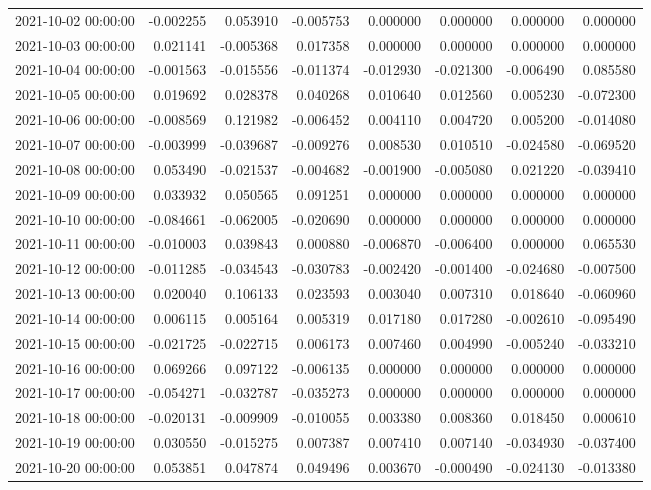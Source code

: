 \begin{tabular}{lrrrrrrr}
2021-10-02 00:00:00 & -0.002255 & 0.053910 & -0.005753 & 0.000000 & 0.000000 & 0.000000 & 0.000000 \\
2021-10-03 00:00:00 & 0.021141 & -0.005368 & 0.017358 & 0.000000 & 0.000000 & 0.000000 & 0.000000 \\
2021-10-04 00:00:00 & -0.001563 & -0.015556 & -0.011374 & -0.012930 & -0.021300 & -0.006490 & 0.085580 \\
2021-10-05 00:00:00 & 0.019692 & 0.028378 & 0.040268 & 0.010640 & 0.012560 & 0.005230 & -0.072300 \\
2021-10-06 00:00:00 & -0.008569 & 0.121982 & -0.006452 & 0.004110 & 0.004720 & 0.005200 & -0.014080 \\
2021-10-07 00:00:00 & -0.003999 & -0.039687 & -0.009276 & 0.008530 & 0.010510 & -0.024580 & -0.069520 \\
2021-10-08 00:00:00 & 0.053490 & -0.021537 & -0.004682 & -0.001900 & -0.005080 & 0.021220 & -0.039410 \\
2021-10-09 00:00:00 & 0.033932 & 0.050565 & 0.091251 & 0.000000 & 0.000000 & 0.000000 & 0.000000 \\
2021-10-10 00:00:00 & -0.084661 & -0.062005 & -0.020690 & 0.000000 & 0.000000 & 0.000000 & 0.000000 \\
2021-10-11 00:00:00 & -0.010003 & 0.039843 & 0.000880 & -0.006870 & -0.006400 & 0.000000 & 0.065530 \\
2021-10-12 00:00:00 & -0.011285 & -0.034543 & -0.030783 & -0.002420 & -0.001400 & -0.024680 & -0.007500 \\
2021-10-13 00:00:00 & 0.020040 & 0.106133 & 0.023593 & 0.003040 & 0.007310 & 0.018640 & -0.060960 \\
2021-10-14 00:00:00 & 0.006115 & 0.005164 & 0.005319 & 0.017180 & 0.017280 & -0.002610 & -0.095490 \\
2021-10-15 00:00:00 & -0.021725 & -0.022715 & 0.006173 & 0.007460 & 0.004990 & -0.005240 & -0.033210 \\
2021-10-16 00:00:00 & 0.069266 & 0.097122 & -0.006135 & 0.000000 & 0.000000 & 0.000000 & 0.000000 \\
2021-10-17 00:00:00 & -0.054271 & -0.032787 & -0.035273 & 0.000000 & 0.000000 & 0.000000 & 0.000000 \\
2021-10-18 00:00:00 & -0.020131 & -0.009909 & -0.010055 & 0.003380 & 0.008360 & 0.018450 & 0.000610 \\
2021-10-19 00:00:00 & 0.030550 & -0.015275 & 0.007387 & 0.007410 & 0.007140 & -0.034930 & -0.037400 \\
2021-10-20 00:00:00 & 0.053851 & 0.047874 & 0.049496 & 0.003670 & -0.000490 & -0.024130 & -0.013380 \\

\end{tabular}
